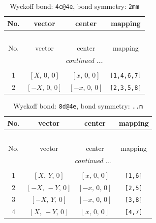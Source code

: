 \documentclass[fleqn,8pt]{jsarticle}
\begin{document}
\begin{longtable}{cccc}
\caption{Wyckoff bond: {\tt 4c@4e}, bond symmetry: {\tt 2mm}}
 \\
 \hline \hline
No. & vector & center & mapping \\ \hline \endfirsthead

\multicolumn{3}{l}{\tablename\ \thetable{}} \\
 \hline \hline
No. & vector & center & mapping \\ \hline \endhead

 \hline \hline
\multicolumn{3}{r}{\footnotesize\it continued ...} \\ \endfoot

 \hline \hline
\multicolumn{3}{r}{} \\ \endlastfoot

1 & $\left[ X,\, 0,\, 0 \right]$ & $\left[ x,\, 0,\, 0 \right]$ & {\tt [1,4,6,7]} \\ \hline
2 & $\left[ - X,\, 0,\, 0 \right]$ & $\left[ - x,\, 0,\, 0 \right]$ & {\tt [2,3,5,8]} \\
\end{longtable}
\renewcommand{\arraystretch}{1.2}
\begin{longtable}{cccc}
\caption{Wyckoff bond: {\tt 8d@4e}, bond symmetry: {\tt ..m}}
 \\
 \hline \hline
No. & vector & center & mapping \\ \hline \endfirsthead

\multicolumn{3}{l}{\tablename\ \thetable{}} \\
 \hline \hline
No. & vector & center & mapping \\ \hline \endhead

 \hline \hline
\multicolumn{3}{r}{\footnotesize\it continued ...} \\ \endfoot

 \hline \hline
\multicolumn{3}{r}{} \\ \endlastfoot

1 & $\left[ X,\, Y,\, 0 \right]$ & $\left[ x,\, 0,\, 0 \right]$ & {\tt [1,6]} \\ \hline
2 & $\left[ - X,\, - Y,\, 0 \right]$ & $\left[ - x,\, 0,\, 0 \right]$ & {\tt [2,5]} \\ \hline
3 & $\left[ - X,\, Y,\, 0 \right]$ & $\left[ - x,\, 0,\, 0 \right]$ & {\tt [3,8]} \\ \hline
4 & $\left[ X,\, - Y,\, 0 \right]$ & $\left[ x,\, 0,\, 0 \right]$ & {\tt [4,7]} \\
\end{longtable}
\end{document}
